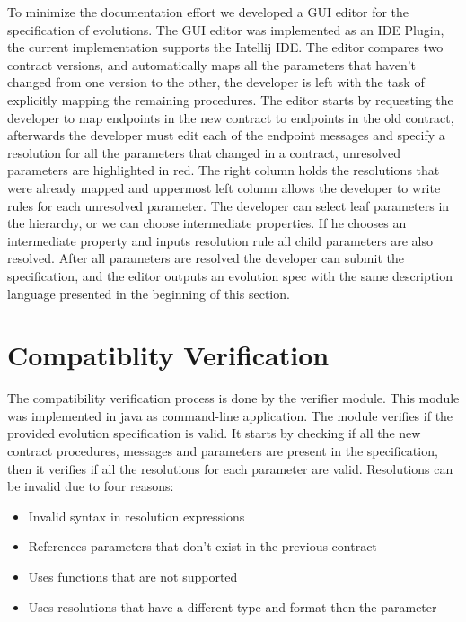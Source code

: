 To minimize the documentation effort we developed a GUI editor for the specification of evolutions.
The GUI editor was implemented as an IDE Plugin, the current implementation supports the Intellij IDE.
The editor compares two contract versions,
and automatically maps all the parameters that haven't changed from one version to the other, the
developer is left with the task of explicitly mapping the remaining procedures.
The editor starts by requesting the developer to map endpoints in the new contract to endpoints in the old contract,
afterwards the developer must edit each of the endpoint messages and specify a resolution for all the parameters that changed
in a contract, unresolved parameters are highlighted in red.
The right column holds the resolutions that were already mapped and uppermost left column allows the developer to write rules
for each unresolved parameter.
The developer can select leaf parameters in the hierarchy, or we can choose intermediate properties.
If he chooses an intermediate property and inputs resolution rule all child parameters are also resolved.
After all parameters are resolved the developer can submit the specification, and
the editor outputs an evolution spec with the same description language presented in the beginning of this section.

\section{Compatiblity Verification} %
\label{sec:compatiblity_verification}

The compatibility verification process is done by the verifier module.
This module was implemented in java as command-line application.
The module verifies if the provided evolution specification is valid.
It starts by checking if all the new contract procedures, messages and parameters are present in the specification,
then it verifies if all the resolutions for each parameter are valid.
Resolutions can be invalid due to four reasons:

\begin{itemize}
    \item Invalid syntax in resolution expressions
    \item References parameters that don't exist in the previous contract
    \item Uses functions that are not supported
    \item Uses resolutions that have a different type and format then the parameter
\end{itemize}

